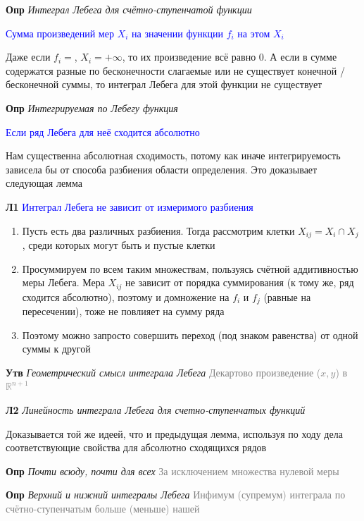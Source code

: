 \textbf{Опр} \textit{Интеграл Лебега для счётно-ступенчатой функции}

\textcolor{blue}{Сумма произведений мер $X_i$ на значении функции $f_i$ на этом $X_i$}

Даже если $f_i = $, $X_i = +\infty$, то их произведение всё равно 0.
А если в сумме содержатся разные по бесконечности слагаемые или не существует конечной / бесконечной суммы, то интеграл Лебега для этой функции не
существует

\textbf{Опр} \textit{Интегрируемая по Лебегу функция}

\textcolor{blue}{Если ряд Лебега для неё сходится абсолютно}

Нам существенна абсолютная сходимость, потому как иначе интегрируемость зависела бы от способа разбиения области
определения.
Это доказывает следующая лемма

\textbf{Л1} \textcolor{blue}{Интеграл Лебега не зависит от измеримого разбиения}

\begin{enumerate}
    \item Пусть есть два различных разбиения.
    Тогда рассмотрим клетки $X_{ij} = X_{i} \cap X_{j}$, среди которых могут быть и пустые клетки
    \item Просуммируем по всем таким множествам, пользуясь счётной аддитивностью меры Лебега.
    Мера $X_{ij}$ не зависит от порядка суммирования (к тому же, ряд сходится абсолютно), поэтому и домножение на $
    f_i$ и $f_j$ (равные на пересечении), тоже не повлияет на сумму ряда
    \item Поэтому можно запросто совершить переход (под знаком равенства) от одной суммы к другой
\end{enumerate}

\textbf{Утв} \textit{Геометрический смысл интеграла Лебега} \textcolor{gray}{Декартово произведение ($x, y$) в
    $\mathbb{R}^{n+1}$}

\textbf{Л2} \textit{Линейность интеграла Лебега для счетно-ступенчатых функций}

Доказывается той же идеей, что и предыдущая лемма, используя по ходу дела соответствующие свойства для абсолютно
сходящихся рядов

\textbf{Опр} \textit{Почти всюду, почти для всех} \textcolor{gray}{За исключением множества нулевой меры}

\textbf{Опр} \textit{Верхний и нижний интегралы Лебега} \textcolor{gray}{Инфимум (супремум) интеграла по
счётно-ступенчатым больше (меньше) нашей}

